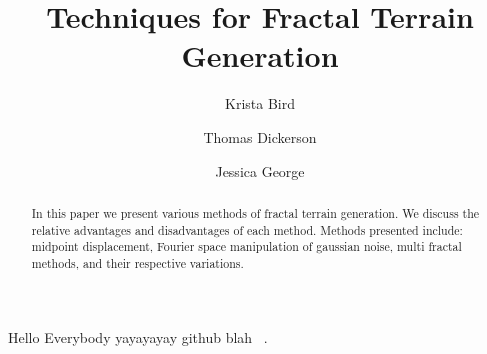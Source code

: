 \documentclass{article}
\title{Techniques for Fractal Terrain Generation}
\author{Krista Bird \and Thomas Dickerson \and Jessica George}
\begin{document}
    \maketitle

     \begin{abstract}
     In this paper we present various methods of fractal terrain generation. We discuss the relative advantages and disadvantages of each method. Methods presented include: midpoint displacement, Fourier space manipulation of gaussian noise, multi fractal methods, and their respective variations. 
     \end{abstract}

     

Hello Everybody yayayayay github
    blah ~\cite{Jo09, PaperII}.

     

     
    
    

     

    
\end{document}
